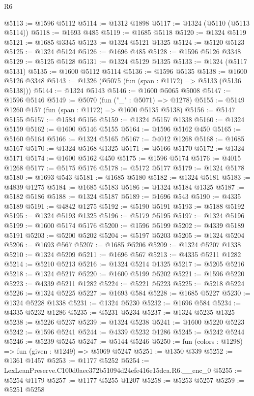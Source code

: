 \begin{lexlean}{R6}
\begin{coremodule}
@5113 := @1596 @5112
@5114 := @1312 @1898
@5117 := @1324 (@5110 (@5113 @5114))
@5118 := @1693 @485
@5119 := @1685 @5118
@5120 := @1324 @5119
@5121 := @1685 @3345
@5123 := @1324 @5121 @1325
@5124 := @5120 @5123
@5125 := @1324 @5124
@5126 := @1696 @485
@5128 := @1596 @5126 @3348
@5129 := @5125 @5128
@5131 := @1324 @5129 @1325
@5133 := @1324 (@5117 @5131)
@5135 := @1600 @5112 @5114
@5136 := @1596 @5135
@5138 := @1600 @5126 @3348
@5143 := @1326 (@5075 (fun (span : @1172) => @5133 (@5136 @5138)))
@5144 := @1324 @5143
@5146 := @1600 @5065 @5008
@5147 := @1596 @5146
@5149 := @5070 (fun ("_" : @5071) => @1278)
@5155 := @5149 @1260 @157 (fun (span : @1172) => @1600 @5135 @5138)
@5156 := @5147 @5155
@5157 := @1584 @5156
@5159 := @1324 @5157 @1338
@5160 := @1324 @5159
@5162 := @1600 @5146 @5155
@5164 := @1596 @5162 @450
@5165 := @5160 @5164
@5166 := @1324 @5165
@5167 := @4012 @1268
@5168 := @1685 @5167
@5170 := @1324 @5168 @1325
@5171 := @5166 @5170
@5172 := @1324 @5171
@5174 := @1600 @5162 @450
@5175 := @1596 @5174
@5176 := @4015 @1268
@5177 := @5175 @5176
@5178 := @5172 @5177
@5179 := @1324 @5178
@5180 := @1693 @543
@5181 := @1685 @5180
@5182 := @1324 @5181
@5183 := @4839 @1275
@5184 := @1685 @5183
@5186 := @1324 @5184 @1325
@5187 := @5182 @5186
@5188 := @1324 @5187
@5189 := @1696 @543
@5190 := @4335 @5189
@5191 := @4842 @1275
@5192 := @5190 @5191
@5193 := @5188 @5192
@5195 := @1324 @5193 @1325
@5196 := @5179 @5195
@5197 := @1324 @5196
@5199 := @1600 @5174 @5176
@5200 := @1596 @5199
@5202 := @4339 @5189 @5191
@5203 := @5200 @5202
@5204 := @5197 @5203
@5205 := @1324 @5204
@5206 := @1693 @567
@5207 := @1685 @5206
@5209 := @1324 @5207 @1338
@5210 := @1324 @5209
@5211 := @1696 @567
@5213 := @4335 @5211 @1282
@5214 := @5210 @5213
@5216 := @1324 @5214 @1325
@5217 := @5205 @5216
@5218 := @1324 @5217
@5220 := @1600 @5199 @5202
@5221 := @1596 @5220
@5223 := @4339 @5211 @1282
@5224 := @5221 @5223
@5225 := @5218 @5224
@5226 := @1324 @5225
@5227 := @1693 @584
@5228 := @1685 @5227
@5230 := @1324 @5228 @1338
@5231 := @1324 @5230
@5232 := @1696 @584
@5234 := @4335 @5232 @1286
@5235 := @5231 @5234
@5237 := @1324 @5235 @1325
@5238 := @5226 @5237
@5239 := @1324 @5238
@5241 := @1600 @5220 @5223
@5242 := @1596 @5241
@5244 := @4339 @5232 @1286
@5245 := @5242 @5244
@5246 := @5239 @5245
@5247 := @5144 @5246
@5250 := fun (colors : @1298) => fun (given : @1249) => @5069 @5247
@5251 := @1350 @339
@5252 := @1361 @1457
@5253 := @1177 @5252
@5254 := LexLeanPreserve.C100d0aec372b51094d24efe416e15dca.R6.__enc_0
@5255 := @5254 @1179
@5257 := @1177 @5255 @1207
@5258 := @5253 @5257
@5259 := @5251 @5258

\end{coremodule}
\end{lexlean}
